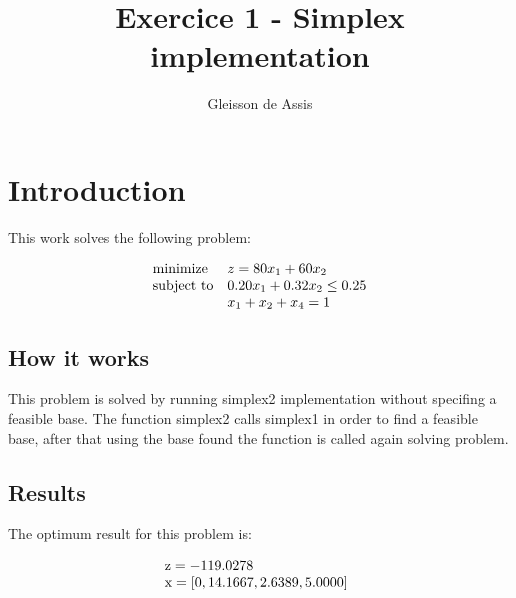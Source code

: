 \documentclass{article}
\begin{document}
\title{Exercice 1 - Simplex implementation}
\author{Gleisson de Assis}
\maketitle{}


\section{Introduction}
This work solves the following problem:

\begin{equation*}
\begin{array}{ll@{}ll}
\text{minimize}  & z = 80x_{1} + 60x_{2} &\\
\text{subject to}& 0.20x_{1} + 0.32x_{2} \leq 0.25\\
                 & x_{1} + x_{2} + x_{4} = 1
\end{array}
\end{equation*}

\subsection{How it works}
This problem is solved by running simplex2 implementation without specifing a
feasible base. The function simplex2 calls simplex1 in order to find a feasible base,
after that using the base found the function is called again solving
problem.

\subsection{Results}

The optimum result for this problem is:

\begin{equation*}
\begin{array}{ll@{}ll}
\text z = -119.0278 &\\
\text x = [0, 14.1667, 2.6389, 5.0000] &\\
\end{array}
\end{equation*}
\end{document}
